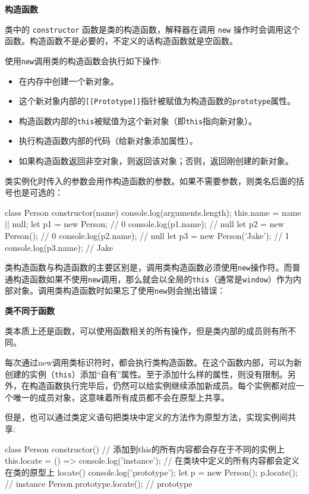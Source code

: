 \noindent\textbf{构造函数}

类中的 \texttt{constructor} 函数是类的构造函数，解释器在调用 \texttt{new} 操作时会调用这个函数。构造函数不是必要的，不定义的话构造函数就是空函数。

使用\texttt{new}调用类的构造函数会执行如下操作:
\begin{itemize}
    \item 在内存中创建一个新对象。
    \item 这个新对象内部的\texttt{[[Prototype]]}指针被赋值为构造函数的\texttt{prototype}属性。
    \item 构造函数内部的\texttt{this}被赋值为这个新对象（即\texttt{this}指向新对象）。
    \item 执行构造函数内部的代码（给新对象添加属性）。
    \item 如果构造函数返回非空对象，则返回该对象；否则，返回刚创建的新对象。
\end{itemize}

类实例化时传入的参数会用作构造函数的参数。如果不需要参数，则类名后面的括号也是可选的：

\begin{JavaScript}
class Person {
    constructor(name) {
        console.log(arguments.length);
        this.name = name || null;
    }
}
let p1 = new Person;            // 0 
console.log(p1.name);           // null 
let p2 = new Person();          // 0 
console.log(p2.name);           // null 
let p3 = new Person('Jake');    // 1 
console.log(p3.name);           // Jake 
\end{JavaScript}

类构造函数与构造函数的主要区别是，调用类构造函数必须使用\texttt{new}操作符。而普通构造函数如果不使用\texttt{new}调用，那么就会以全局的\texttt{this}（通常是\texttt{window}）作为内部对象。调用类构造函数时如果忘了使用\texttt{new}则会抛出错误：

\noindent\textbf{类不同于函数}

类本质上还是函数，可以使用函数相关的所有操作，但是类内部的成员则有所不同。

每次通过new调用类标识符时，都会执行类构造函数。在这个函数内部，可以为新创建的实例（\texttt{this}）添加“自有”属性。至于添加什么样的属性，则没有限制。另外，在构造函数执行完毕后，仍然可以给实例继续添加新成员。每个实例都对应一个唯一的成员对象，这意味着所有成员都不会在原型上共享。

但是，也可以通过类定义语句把类块中定义的方法作为原型方法，实现实例间共享:

\begin{JavaScript}
class Person {
    constructor() {     // 添加到this的所有内容都会存在于不同的实例上    
        this.locate = () => console.log('instance');
    } 
    // 在类块中定义的所有内容都会定义在类的原型上
    locate() { console.log('prototype'); }
} let p = new Person();
p.locate();                 // instance 
Person.prototype.locate();  // prototype 
\end{JavaScript}

